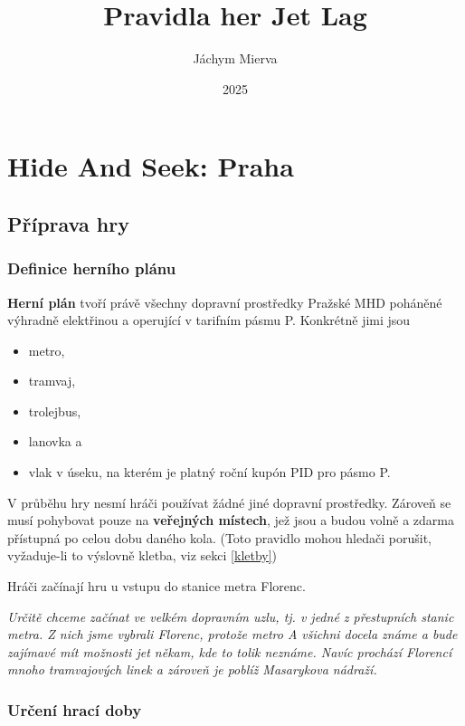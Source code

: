 \documentclass{book}
\title{Pravidla her Jet Lag}
\author{Jáchym Mierva}
\date{2025}
\newenvironment{reasoning}{\begin{small}\itshape}{\end{small}}
\begin{document}
\maketitle
\tableofcontents

\chapter{Hide And Seek: Praha}

\section{Příprava hry}

\subsection{Definice herního plánu}\label{herní plán}

\textbf{Herní plán} tvoří právě všechny dopravní prostředky Pražské MHD poháněné výhradně elektřinou a operující v tarifním pásmu P. Konkrétně jimi jsou
\begin{itemize}[nosep]
	\item metro,
	\item tramvaj,
	\item trolejbus,
	\item lanovka a
	\item vlak v úseku, na kterém je platný roční kupón PID pro pásmo P.
\end{itemize}
V průběhu hry nesmí hráči používat žádné jiné dopravní prostředky. Zároveň se musí pohybovat pouze na \textbf{veřejných místech}, jež jsou a budou volně a zdarma přístupná po celou dobu daného kola. (Toto pravidlo mohou hledači porušit, vyžaduje-li to výslovně kletba, viz sekci \ref{kletby})

Hráči začínají hru u vstupu do stanice metra Florenc.

\begin{reasoning}
	Určitě chceme začínat ve velkém dopravním uzlu, tj. v jedné z přestupních stanic metra. Z nich jsme vybrali Florenc, protože metro A všichni docela známe a bude zajímavé mít možnosti jet někam, kde to tolik neznáme. Navíc prochází Florencí mnoho tramvajových linek a zároveň je poblíž Masarykova nádraží.
\end{reasoning}

\subsection{Určení hrací doby}
\end{document}
